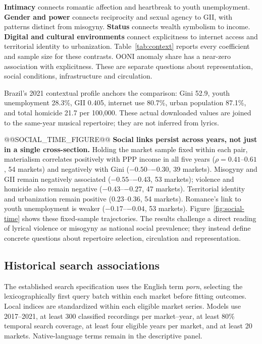 \documentclass[10pt,a4paper,twocolumn]{article}
\begin{document}
\textbf{Intimacy} connects romantic affection and heartbreak to youth unemployment. \textbf{Gender and power} connects reciprocity and sexual agency to GII, with patterns distinct from misogyny. \textbf{Status} connects wealth symbolism to income. \textbf{Digital and cultural environments} connect explicitness to internet access and territorial identity to urbanization. Table~\ref{tab:context} reports every coefficient and sample size for these contrasts. OONI anomaly share has a near-zero association with explicitness. These are separate questions about representation, social conditions, infrastructure and circulation.

Brazil's 2021 contextual profile anchors the comparison: Gini 52.9, youth unemployment 28.3\%, GII 0.405, internet use 80.7\%, urban population 87.1\%, and total homicide 21.7 per 100,000. These actual downloaded values are joined to the same-year musical repertoire; they are not inferred from lyrics.

@@SOCIAL_TIME_FIGURE@@
\textbf{Social links persist across years, not just in a single cross-section.} Holding the market sample fixed within each pair, materialism correlates positively with PPP income in all five years ($\rho=0.41$--$0.61$, 54 markets) and negatively with Gini ($-0.50$--$-0.30$, 39 markets). Misogyny and GII remain negatively associated ($-0.55$--$-0.43$, 53 markets); violence and homicide also remain negative ($-0.43$--$-0.27$, 47 markets). Territorial identity and urbanization remain positive ($0.23$--$0.36$, 54 markets). Romance's link to youth unemployment is weaker ($-0.17$--$-0.04$, 53 markets). Figure~\ref{fig:social-time} shows these fixed-sample trajectories. The results challenge a direct reading of lyrical violence or misogyny as national social prevalence; they instead define concrete questions about repertoire selection, circulation and representation.

\subsection{Historical search associations}
The established search specification uses the English term \textit{porn}, selecting the lexicographically first query batch within each market before fitting outcomes. Local indices are standardized within each eligible market series. Models use 2017--2021, at least 300 classified recordings per market--year, at least 80\% temporal search coverage, at least four eligible years per market, and at least 20 markets. Native-language terms remain in the descriptive panel.
\end{document}
